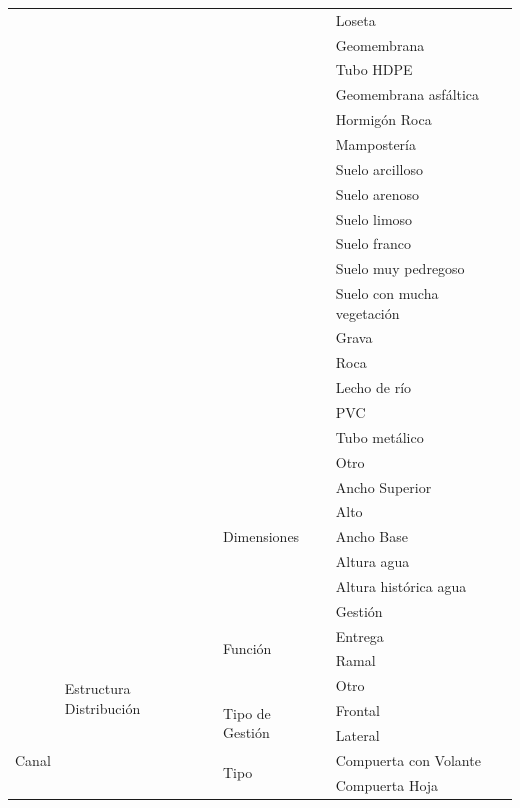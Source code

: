 \documentclass[]{article}
\begin{document}
\begin{longtable}{|p{3cm}|p{3.5cm}|p{3.5cm}|p{3.5cm}|}
    \cline{4-4}
    & & & Loseta\\
    \cline{4-4}
    & & & Geomembrana\\
    \cline{4-4}
    & & & Tubo HDPE\\
    \cline{4-4}
    & & & Geomembrana asfáltica\\
    \cline{4-4}
    & & & Hormigón Roca\\
    \cline{4-4}
    & & & Mampostería\\
    \cline{4-4}
    & & & Suelo arcilloso\\
    \cline{4-4}
    & & & Suelo arenoso\\
    \cline{4-4}
    & & & Suelo limoso\\
    \cline{4-4}
    & & & Suelo franco\\ \pagebreak
    \cline{4-4}
    & & & Suelo muy pedregoso\\
    \cline{4-4}
    & & & Suelo con mucha vegetación\\
    \cline{4-4}
    & & & Grava\\
    \cline{4-4}
    & & & Roca\\
    \cline{4-4}
    & & & Lecho de río\\
    \cline{4-4}
    & & & PVC\\
    \cline{4-4}
    & & & Tubo metálico\\
    \cline{4-4}
    & & & Otro\\
    \cline{3-4}    
    & & \multirow {5}{3.5cm}{Dimensiones} & Ancho Superior\\
    \cline{4-4}
    & & & Alto\\
    \cline{4-4}
    & & & Ancho Base\\
    \cline{4-4}
    & & & Altura agua\\
    \cline{4-4}
    & & & Altura histórica agua\\
    \cline{2-4}
    & \multirow {31}{3.5cm}{Estructura Distribución} & \multirow {4}{3.5cm}{Función} &  Gestión\\
	\cline{4-4}
	& & & Entrega\\
	\cline{4-4}
	& & & Ramal\\
	\cline{4-4}
	& & & Otro\\
    \cline{3-4}
    & & \multirow {2}{3.5cm}{Tipo de Gestión} & Frontal\\
    \cline{4-4}
    & & & Lateral\\
    \cline{3-4}
    Canal & & \multirow {9}{3.5cm}{Tipo} & Compuerta con Volante\\
    \cline{4-4}
    & & & Compuerta Hoja\\

\end{longtable}
\end{document}
